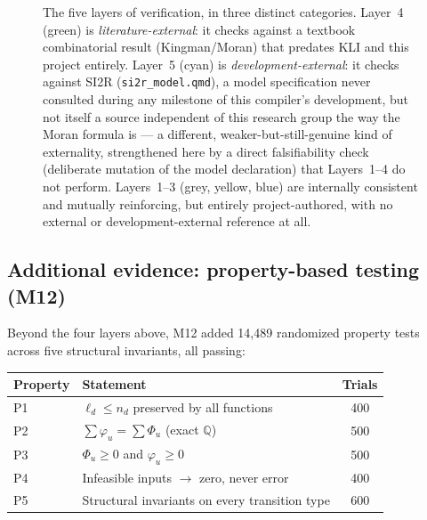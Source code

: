 \documentclass[11pt,leqno]{article}
\newcommand{\code}[1]{\texttt{#1}}
\theoremstyle{plain}
\theoremstyle{definition}
\begin{document}
\begin{figure}[ht]
\caption{The five layers of verification, in three distinct categories.
Layer~4 (green) is \emph{literature-external}: it checks against a
textbook combinatorial result (Kingman/Moran) that predates KLI and this
project entirely. Layer~5 (cyan) is \emph{development-external}: it checks
against SI2R (\code{si2r\_model.qmd}), a model specification never
consulted during any milestone of this compiler's development, but not
itself a source independent of this research group the way the Moran
formula is --- a different, weaker-but-still-genuine kind of externality,
strengthened here by a direct falsifiability check (deliberate mutation of
the model declaration) that Layers~1--4 do not perform. Layers~1--3 (grey,
yellow, blue) are internally consistent and mutually reinforcing, but
entirely project-authored, with no external or development-external
reference at all.}
\label{fig:layers}
\end{figure}

\subsection{Additional evidence: property-based testing (M12)}

Beyond the four layers above, M12 added 14{,}489 randomized property
tests across five structural invariants, all passing:

\begin{center}
\renewcommand{\arraystretch}{1.15}
\begin{tabular}{llc}
\toprule
\textbf{Property} & \textbf{Statement} & \textbf{Trials} \\
\midrule
P1 & $\ell_d \le n_d$ preserved by all functions & 400 \\
P2 & $\sum \varphi_u = \sum \Phi_u$ (exact $\mathbb{Q}$) & 500 \\
P3 & $\Phi_u \ge 0$ and $\varphi_u \ge 0$ & 500 \\
P4 & Infeasible inputs $\to$ zero, never error & 400 \\
P5 & Structural invariants on every transition type & 600 \\
\bottomrule
\end{tabular}
\end{center}
\end{document}
